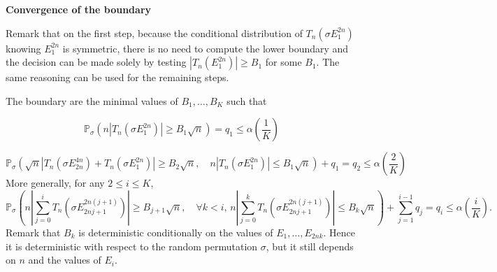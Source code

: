\documentclass{article}
\theoremstyle{plain}
\theoremstyle{remark}
\renewcommand{\P}{\mathbb{P}}
\newcommand{\1}{\mathbbm{1}}
\numberwithin{equation}{section}
\begin{document}
\textbf{Convergence of the boundary}

Remark that on the first step, because the conditional distribution of $T_n(\sigma E_1^{2n})$ knowing $E_1^{2n}$ is symmetric, there is no need to compute the lower boundary and the decision can be made solely by testing $|T_n(E_1^{2n})|\ge B_1$ for some $B_1$. The same reasoning can be used for the remaining steps.

The boundary are the minimal values of $B_1,\dots, B_K$ such that

$$\P_\sigma(n|T_n(\sigma E_1^{2n})|\ge B_1\sqrt{n}) = q_1 \le \alpha\left(\frac{1}{K}\right) $$

$$\P_\sigma\left( \sqrt{n}|T_n(\sigma E_{2n}^{4n})+T_n(\sigma E_1^{2n})|\ge  B_2\sqrt{n},\quad  n|T_n(\sigma E_1^{2n})|\le  B_1\sqrt{n}  \right)+q_1 = q_2 \le\alpha\left(\frac{2}{K}\right) $$
More generally, for any $2\le i\le K$,
$$ \P_\sigma\left(n\left|\sum_{j=0}^i T_n\left(\sigma E_{2nj+1}^{2n(j+1)}\right)\right|\ge B_{j+1} \sqrt{n}, \quad \forall k < i,\,  n\left|\sum_{j=0}^k T_n\left(\sigma E_{2nj+1}^{2n(j+1)}\right)\right|\le  B_k\sqrt{n}  \right)+\sum_{j=1}^{i-1}q_j  = q_i \le\alpha\left(\frac{i}{K}\right).$$
Remark that $B_k$ is deterministic conditionally on the values of $E_1,\dots,E_{2nk}$. Hence it is deterministic with respect to the random permutation $\sigma$, but it still depends on $n$ and the values of $E_i$.
\end{document}
